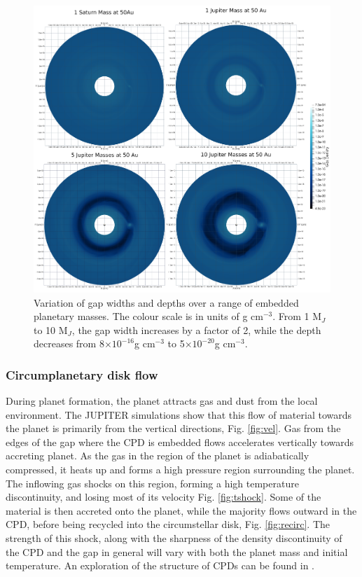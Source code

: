 \documentclass[preprint2]{aastex62}
\begin{document}
\begin{figure}[htb!]
	\centering
	\includegraphics[width=\linewidth]{figures/Presentation/Gaps/Gaps.png}
	\caption{\label{fig:gaps}Variation of gap widths and depths over a range of embedded planetary masses. The colour scale is in units of g cm$^{-3}$. From 1 M$_{J}$ to 10 M$_{J}$, the gap width increases by a factor of 2, while the depth decreases from 8$\times10^{-16}$g cm$^{-3}$ to 5$\times10^{-20}$g cm$^{-3}$.}
\end{figure}

\subsubsection{Circumplanetary disk flow}

During planet formation, the planet attracts gas and dust from the local environment. The JUPITER simulations show that this flow of material towards the planet is primarily from the vertical directions, Fig. \ref{fig:vel}. Gas from the edges of the gap where the CPD is embedded flows accelerates vertically towards accreting planet. As the gas in the region of the planet is adiabatically compressed, it heats up and forms a high pressure region surrounding the planet. The inflowing gas shocks on this region, forming a high temperature discontinuity, and losing most of its velocity Fig. \ref{fig:tshock}. Some of the material is then accreted onto the planet, while the majority flows outward in the CPD, before being recycled into the circumstellar disk, Fig. \ref{fig:recirc}. The strength of this shock, along with the sharpness of the density discontinuity of the CPD and the gap in general will vary with both the planet mass and initial temperature. An exploration of the structure of CPDs can be found in \cite{Szulagyi2016}.
 
\end{document}
